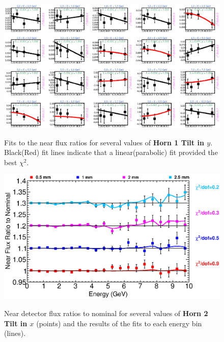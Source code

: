 \begin{figure}[ht]
  \begin{center}
    {\includegraphics[width=5.0in]{figures/Horn1YTilt_near_fits.eps}}
  \end{center}
\caption{ Fits to the near flux ratios for several values of {\bf Horn 1 Tilt in $y$}. Black(Red) fit lines indicate that a linear(parabolic) fit provided the best $\chi^2$. }
\end{figure}

\clearpage

\begin{figure}[ht]
  \begin{center}
    {\includegraphics[width=6.0in]{figures/Horn2XTilt_near_summary.eps}}
  \end{center}
\caption{ Near detector flux ratios to nominal for several values of {\bf Horn 2 Tilt in $x$} (points) and the results of the fits to each energy bin (lines).}
\end{figure}

